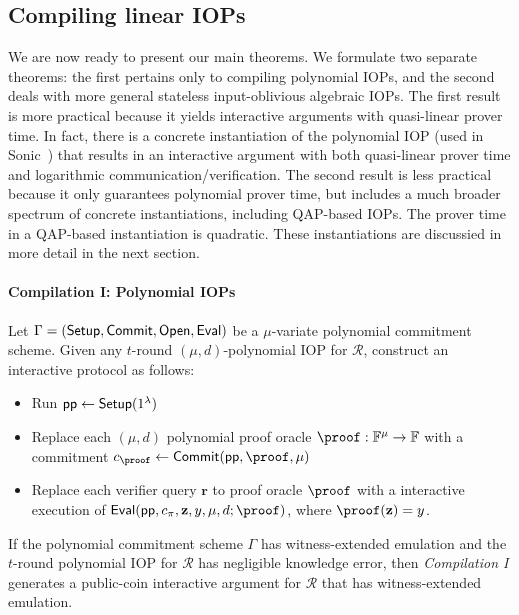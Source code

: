 \subsection{Compiling linear IOPs} 
We are now ready to present our main theorems. We formulate two separate theorems: the first pertains only to compiling polynomial IOPs, and the second deals with more general stateless input-oblivious algebraic IOPs. The first result is more practical because it yields interactive arguments with quasi-linear prover time. In fact, there is a concrete instantiation of the polynomial IOP (used in Sonic~\cite{Sonic}) that results in an interactive argument with both quasi-linear prover time and logarithmic communication/verification. The second result is less practical because it only guarantees polynomial prover time, but includes a much broader spectrum of concrete instantiations, including QAP-based IOPs. The prover time in a QAP-based instantiation is quadratic. These instantiations are discussied in more detail in the next section. 

\paragraph{Compilation I: Polynomial IOPs} 
Let $\Gamma = (\textsf{{Setup}}, \textsf{{Commit}}, \textsf{{Open}}, \textsf{{Eval}})$ be a $\mu$-variate polynomial commitment scheme. Given any $t$-round $(\mu, d)$-polynomial IOP for $\mathcal{R}$, construct an interactive protocol as follows: 
\begin{itemize}
\item Run $\textsf{pp} \leftarrow \textsf{{Setup}}(1^\lambda)$
\item Replace each $(\mu, d)$ polynomial proof oracle $\proof: \mathbb{F}^\mu \rightarrow \mathbb{F}$ with a commitment $c_{\proof} \leftarrow \pro{Commit}(\params, \proof, \mu)$
\item Replace each verifier query $\mathbf{r}$ to proof oracle $\proof$ with a interactive execution of $\pro{Eval}(\params, c_\pi, \mathbf{z}, y, \mu, d; \proof)$, where $\proof(\mathbf{z}) = y$. 
\end{itemize}


\begin{lemma}
If the polynomial commitment scheme $\Gamma$ has witness-extended emulation and the $t$-round polynomial IOP for $\mathcal{R}$ has negligible knowledge error, then \emph{Compilation I} generates a public-coin interactive argument for $\mathcal{R}$ that has witness-extended emulation. 
\end{lemma}

